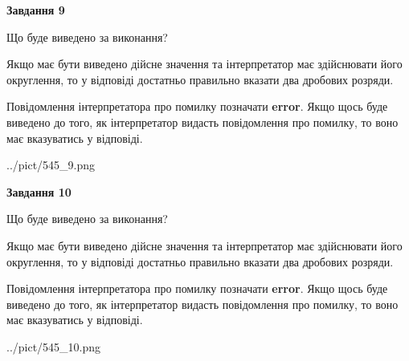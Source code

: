 \documentclass[12pt, ukrainian]{article}
\begin{document}
{\begin {Large}
{\begin {center}\textbf{Завдання 9}\end {center}}\par
Що буде виведено за виконання? \par

Якщо має бути виведено дійсне значення та інтерпретатор має здійснювати його округлення, 
то у відповіді достатньо правильно вказати два дробових розряди.

Повідомлення інтерпретатора про помилку позначати \textbf{error}.
Якщо щось буде виведено до того, як інтерпретатор видасть повідомлення про помилку, 
то воно має вказуватись у відповіді. \par

\begin{center}
	{../pict/545_9.png}
\end{center}
\newpage

{\begin {center}\textbf{Завдання 10}\end {center}}\par
Що буде виведено за виконання? \par

Якщо має бути виведено дійсне значення та інтерпретатор має здійснювати його округлення, 
то у відповіді достатньо правильно вказати два дробових розряди.

Повідомлення інтерпретатора про помилку позначати \textbf{error}.
Якщо щось буде виведено до того, як інтерпретатор видасть повідомлення про помилку, 
то воно має вказуватись у відповіді. \par

\begin{center}
	{../pict/545_10.png}
\end{center}
\newpage

\end {Large}}
\end{document}
